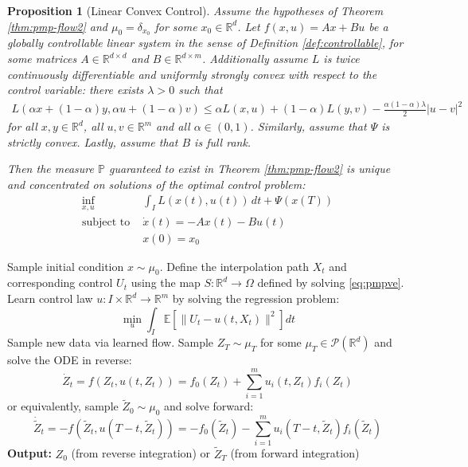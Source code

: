 \documentclass{article}
\newtheorem{proposition}[theorem]{Proposition}
\newcommand{\Rd}{\mathbb{R}^d}
\begin{document}
\begin{proposition}[Linear Convex Control]
\label{prop:linear-convex2}
Assume the hypotheses of Theorem \ref{thm:pmp-flow2} and $\mu_0 = \delta_{x_0}$ for some $x_0 \in \Rd$. Let $f(x,u) = Ax + Bu$ be a globally controllable linear system in the sense of Definition \ref{def:controllable}, for some matrices $A \in \mathbb{R}^{d \times d}$ and $B \in \mathbb{R}^{d \times m}$. Additionally assume $L$ is twice continuously differentiable and uniformly strongly convex with respect to the control variable: there exists $\lambda > 0$ such that 
\begin{align}
L(\alpha x + (1-\alpha)y, \alpha u + (1-\alpha)v) \leq \alpha L(x,u) + (1-\alpha)L(y,v) - \frac{\alpha(1-\alpha)\lambda}{2}|u-v|^2
\end{align}
for all $x,y \in \mathbb{R}^d$, all $u,v \in \mathbb{R}^m$ and all $\alpha \in (0,1)$. Similarly, assume that $\Psi$ is strictly convex. Lastly, assume that $B$ is full rank. 

Then the measure $\mathbb{P}$ guaranteed to exist in Theorem \ref{thm:pmp-flow2} is unique and concentrated on solutions of the optimal control problem:
\begin{align}
\label{eq:linear-opt}
\inf_{x,u} &\int_I L(x(t),u(t)) \, dt + \Psi(x(T)) \\
\text{subject to }  &\dot{x}(t) = -Ax(t) - Bu(t)  \\
&x(0) = x_0
\end{align}
\end{proposition}



\begin{algorithm}
\caption{Flow Matching Along Pontryagin System through Time Reversal (Variable-end Point Problems)}
\label{alg:pmp-flowve}
\begin{algorithmic}[1]
\State Sample initial condition $x  \sim \mu_0$. 
\State Define the interpolation path $X_t$ and corresponding control $U_t$ using the map $S: \mathbb{R}^d \rightarrow \Omega$ defined by solving \eqref{eq:pmpve}.
\State Learn control law $u: I \times \mathbb{R}^d \rightarrow \mathbb{R}^m$ by solving the regression problem:
\[\min_{u} \int_I \mathbb{E}\left[\|U_t - u(t, X_t)\|^2\right] dt\]
\State Sample new data via learned flow. Sample $Z_T \sim \mu_T$ for some $\mu_T \in \mathcal{P}(\mathbb{R}^d)$ and solve the ODE in reverse:
\[\dot{Z}_t = f(Z_t, u(t, Z_t)) = f_0(Z_t) + \sum_{i=1}^m u_i(t, Z_t) f_i(Z_t)\]
or equivalently, sample $\tilde{Z}_0 \sim \mu_0$ and solve forward:
\[\dot{\tilde{Z}}_t = -f(\tilde{Z}_t, u(T-t, \tilde{Z}_t)) = -f_0(\tilde{Z}_t) - \sum_{i=1}^m u_i(T-t, \tilde{Z}_t) f_i(\tilde{Z}_t)\]
\State \textbf{Output:} $Z_0$ (from reverse integration) or $\tilde{Z}_T$ (from forward integration)
\end{algorithmic}
\end{algorithm}
\end{document}
